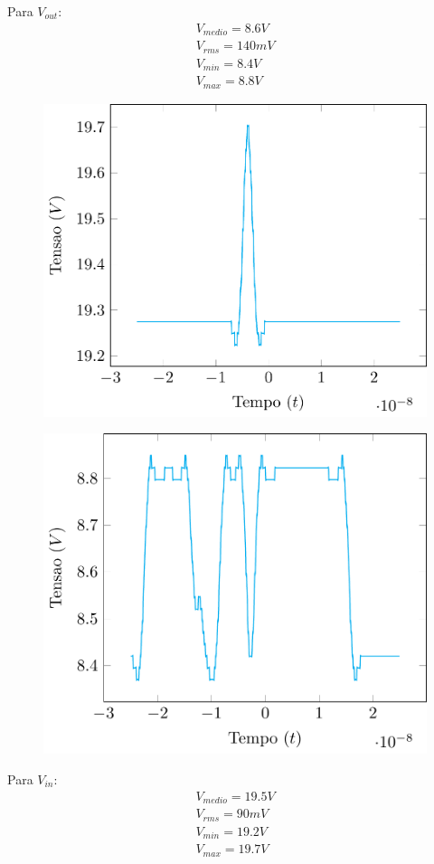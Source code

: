 \documentclass[12pt,a4paper]{article}
\begin{document}
Para $V_{out}$:
\begin{align*}
V_{medio} = 8.6 V \\
V_{rms} = 140 mV \\
V_{min} = 8.4 V \\
V_{max} = 8.8 V 
\end{align*}
\begin{figure}[htpb]
  \centering
  \includegraphics[width=0.8\linewidth]{./exp1/entrada_exp1.pdf}
\caption{}
  \label{fig:./exp1/entrada_exp1}
\end{figure}
\begin{figure}[htpb]
  \centering
  \includegraphics[width=0.8\linewidth]{./exp1/saida_exp1.pdf}
\caption{}
  \label{fig:./exp1/saida_exp1.pdf}
\end{figure}
Para $V_{in}$:
\begin{align*}
V_{medio} = 19.5 V \\
V_{rms} = 90mV \\
V_{min} = 19.2 V \\
V_{max} = 19.7 V 
\end{align*}
\end{document}
